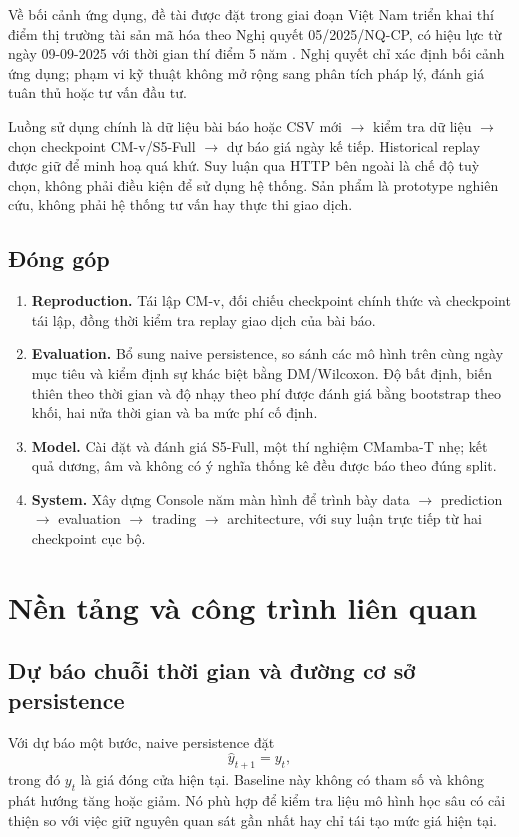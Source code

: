 \documentclass[13pt,a4paper,oneside]{report}
\begin{document}
Về bối cảnh ứng dụng, đề tài được đặt trong giai đoạn Việt Nam triển khai thí điểm thị trường tài sản
mã hóa theo Nghị quyết 05/2025/NQ-CP, có hiệu lực từ ngày 09-09-2025 với thời gian thí điểm 5 năm
\cite{nq05}. Nghị quyết chỉ xác định bối cảnh ứng dụng; phạm vi kỹ thuật không mở rộng sang phân tích
pháp lý, đánh giá tuân thủ hoặc tư vấn đầu tư.

Luồng sử dụng chính là dữ liệu bài báo hoặc CSV mới $\to$ kiểm tra dữ liệu $\to$ chọn checkpoint
CM-v/S5-Full $\to$ dự báo giá ngày kế tiếp. Historical replay được giữ để minh hoạ quá khứ. Suy
luận qua HTTP bên ngoài là chế độ tuỳ chọn, không phải điều kiện để sử dụng hệ thống. Sản phẩm là
prototype nghiên cứu, không phải hệ thống tư vấn hay thực thi giao dịch.

\section{Đóng góp}\label{sec:contrib}
\begin{enumerate}
\item \textbf{Reproduction.} Tái lập CM-v, đối chiếu checkpoint chính thức và checkpoint tái lập,
đồng thời kiểm tra replay giao dịch của bài báo.
\item \textbf{Evaluation.} Bổ sung naive persistence, so sánh các mô hình trên cùng ngày mục tiêu và
kiểm định sự khác biệt bằng DM/Wilcoxon.
Độ bất định, biến thiên theo thời gian và độ nhạy theo phí được đánh giá bằng bootstrap theo khối,
hai nửa thời gian và ba mức phí cố định.
\item \textbf{Model.} Cài đặt và đánh giá S5-Full, một thí nghiệm CMamba-T nhẹ; kết quả dương, âm và
không có ý nghĩa thống kê đều được báo theo đúng split.
\item \textbf{System.} Xây dựng Console năm màn hình để trình bày data $\to$ prediction $\to$
evaluation $\to$ trading $\to$ architecture, với suy luận trực tiếp từ hai checkpoint cục bộ.
\end{enumerate}

\chapter{Nền tảng và công trình liên quan}\label{chap:background}

\section{Dự báo chuỗi thời gian và đường cơ sở persistence}\label{sec:persistence}
Với dự báo một bước, naive persistence đặt
\begin{equation}\label{eq:persistence}
\widehat{y}_{t+1}=y_t,
\end{equation}
trong đó $y_t$ là giá đóng cửa hiện tại. Baseline này không có tham số và không phát hướng tăng hoặc
giảm. Nó phù hợp để kiểm tra liệu mô hình học sâu có cải thiện so với việc giữ nguyên quan sát gần
nhất hay chỉ tái tạo mức giá hiện tại.
\end{document}
